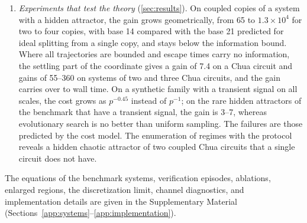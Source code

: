 \begin{enumerate}
\item \emph{Experiments that test the theory} (\cref{sec:results}). On coupled copies of a system with a hidden attractor, the gain grows geometrically, from 65 to $1.3\times10^4$ for two to four copies, with base 14 compared with the base 21 predicted for ideal splitting from a single copy, and stays below the information bound. Where all trajectories are bounded and escape times carry no information, the settling part of the coordinate gives a gain of 7.4 on a Chua circuit and gains of 55--360 on systems of two and three Chua circuits, and the gain carries over to wall time. On a synthetic family with a transient signal on all scales, the cost grows as $p^{-0.45}$ instead of $p^{-1}$; on the rare hidden attractors of the benchmark that have a transient signal, the gain is 3--7, whereas evolutionary search is no better than uniform sampling. The failures are those predicted by the cost model. The enumeration of regimes with the protocol reveals a hidden chaotic attractor of two coupled Chua circuits that a single circuit does not have.
\end{enumerate}
The equations of the benchmark systems, verification episodes, ablations, enlarged regions, the discretization limit, channel diagnostics, and implementation details are given in the Supplementary Material (Sections~\ref{app:systems}--\ref{app:implementation}).
